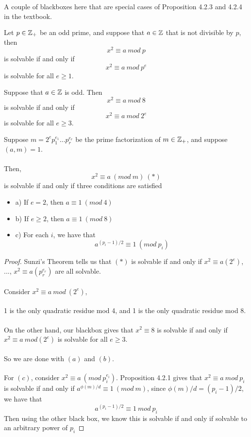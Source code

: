 \noindent A couple of blackboxes here that are special cases of Proposition 4.2.3 and 4.2.4 in the textbook.

\begin{proposition}
Let $p \in \mathbb{Z}_+$ be an odd prime, and suppose that $a \in \mathbb{Z}$ that is not divisible by $p$, then
\[x^2 \equiv a\ mod\ p\]
is solvable if and only if
\[x^2 \equiv a\ mod\ p^e\]
is solvable for all $e \geq 1$.
\end{proposition}

\begin{proposition}
Suppose that $a \in \mathbb{Z}$ is odd. Then 
\[x^2 \equiv a\ mod\ 8\]
is solvable if and only if
\[x^2 \equiv a\ mod\ 2^e\]
is solvable for all $e \geq 3$.
\end{proposition}

\begin{proposition}[5.1.1]
Suppose $m = 2^e p_1^{e_1} ... p_r^{e_r}$ be the prime factorization of $m \in \mathbb{Z}_+$, and suppose $(a, m) = 1$.\\\\
Then,
\[x^2 \equiv a\ (mod\ m)\ (*)\]
is solvable if and only if three conditions are satisfied
\begin{itemize}
    \item a) If $e = 2$, then $a \equiv 1\ (mod\ 4)$
    \item b) If $e \geq 2$, then $a \equiv 1\ (mod\ 8)$
    \item c) For each $i$, we have that
    \[a^{(p_i - 1)/2} \equiv 1\ (mod\ p_i)\]
\end{itemize}
\end{proposition}

\begin{proof}
Sunzi's Theorem tells us that $(*)$ is solvable if and only if $x^2 \equiv a(2^e)$, ..., $x^2 \equiv a(p_r^{e_r})$ are all solvable.\\\\
Consider $x^2 \equiv a\ mod\ (2^e)$,\\\\
1 is the only quadratic residue mod 4, and 1 is the only quadratic residue mod 8.\\\\
On the other hand, our blackbox gives that $x^2 \equiv 8$ is solvable if and only if $x^2 \equiv a\ mod(2^e)$ is solvable for all $e \geq 3$.\\\\
So we are done with $(a)$ and $(b)$.\\\\
For $(c)$, consider $x^2 \equiv a\ (mod\ p_i^{e_i})$. Proposition 4.2.1 gives that $x^2 \equiv a\ mod\ p_i$ is solvable if and only if $a^{\phi(m)/d} \equiv 1\ (mod\ m)$, since $\phi(m)/d = (p_i - 1)/2$, we have that
\[a^{(p_i - 1)/2} \equiv 1\ mod\ p_i\]
Then using the other black box, we know this is solvable if and only if solvable to an arbitrary power of $p_i$
\end{proof}

